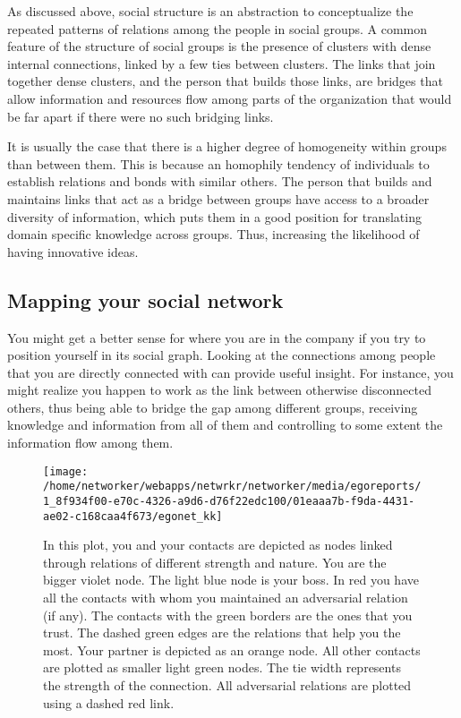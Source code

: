 \documentclass[a4paper,12pt]{article}
\begin{document}
As discussed above, social structure is an abstraction to conceptualize the repeated patterns of relations among the people in social groups. A common feature of the structure of social groups is the presence of clusters with dense internal connections, linked by a few ties between clusters. The links that join together dense clusters, and the person that builds those links, are bridges that allow information and resources flow among parts of the organization that would be far apart if there were no such bridging links.

It is usually the case that there is a higher degree of homogeneity within groups than between them. This is because an homophily tendency of individuals to establish relations and bonds with similar others. The person that builds and maintains links that act as a bridge between groups have access to a broader diversity of information, which puts them in a good position for translating domain specific knowledge across groups. Thus, increasing the likelihood of having innovative ideas.


\newpage


\subsection*{Mapping your social network}


You might get a better sense for where you are in the company if you try to position yourself in its social graph. Looking at the connections among people that you are directly connected with can provide useful insight. For instance, you might realize you happen to work as the link between otherwise disconnected others, thus being able to bridge the gap among different groups, receiving knowledge and information from all of them and controlling to some extent the information flow among them.


\begin{figure}[H]
\centering
\texttt{[image: /home/networker/webapps/netwrkr/networker/media/egoreports/1\_8f934f00-e70c-4326-a9d6-d76f22edc100/01eaaa7b-f9da-4431-ae02-c168caa4f673/egonet\_kk]}
\caption{In this plot, you and your contacts are depicted as nodes linked through relations of different strength and nature. You are the bigger violet node. The light blue node is your boss. In red you have all the contacts with whom you maintained an adversarial relation (if any). The contacts with the green borders are the ones that you trust. The dashed green edges are the relations that help you the most. Your partner is depicted as an orange node. All other contacts are plotted as smaller light green nodes. The tie width represents the strength of the connection. All adversarial relations are plotted using a dashed red link.}
\end{figure}
\end{document}

